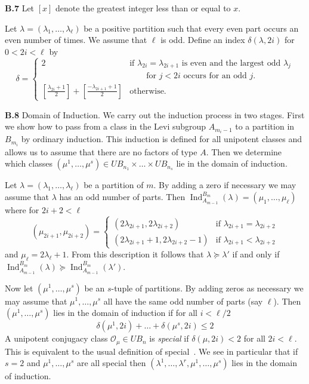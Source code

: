 \documentclass{amsart}
\newcommand\Am		{A_{m-1}}
\newcommand\Ind	{\operatorname{Ind}}
\newcommand\lam	{\lambda}
\newcommand\lams	{(\lam_1,\dots,\lam_\ell)}
\newcommand\lamsmus{(\lam^1,\dots,\lam^r,\mu^1,\dots,\mu^s)}
\newcommand\mus	{(\mu_1,\dots,\mu_\ell)}
\newcommand\cO		{{\mathcal O}}
\begin{document}
\noindent
{\bf B.7} \qquad Let $[x]$ denote the greatest integer less than or equal to
$x$.

Let $\lam = \lams$ be a positive partition such that every even part occurs
an even number of times.  We assume that $\ell$ is odd.  Define an index
$\delta(\lam,2i)$ for $0 < 2i < \ell$ by
	$$
\delta = \begin{cases} 2 &\text{if $\lam_{2i} = \lam_{2i+1}$ 
is even and the largest odd $\lam_j$} \\
&\qquad \text{for $j<2i$ occurs for an odd $j$.} \\
\left[ \textstyle{\frac{\lam_{2i} + 1}{2}} \right] + 
\left[ \textstyle{\frac{-\lam_{2i+1} + 1}{2}} \right] &\text{otherwise.}
\end{cases}
	$$

\noindent
{\bf B.8} \qquad Domain of Induction.  We carry out the induction process in
two stages.  First we show how to pass from a class in the Levi subgroup
$A_{m_i-1}$ to a partition in $B_{m_i}$ by ordinary induction.  This induction
is defined for all unipotent classes and allows us to assume that there are
no factors of type $A$.  Then we determine which classes
$(\mu^1 ,\dots, \mu^s) \in UB_{n_1} \times\dots\times UB_{n_s}$ lie in the
domain of induction.

Let $\lam = \lams$ be a partition of $m$.  By adding a zero if necessary we
may assume that $\lam$ has an odd number of parts.  Then
$\Ind_{{\Am}}^{B_m} (\lam) = \mus$ where for $2i + 2 < \ell$
	$$
(\mu_{2i+1},\mu_{2i+2}) = \begin{cases} 
(2\lam_{2i+1}, 2\lam_{2i+2}) &\text{if $\lam_{2i+1} = \lam_{2i+2}$} \\
(2\lam_{2i+1} + 1, 2\lam_{2i+2} - 1) &\text{if $\lam_{2i+1} < \lam_{2i+2}$}
\end{cases}
	$$
and $\mu_\ell = 2\lam_\ell + 1$.  From this description it follows that
$\lam \succeq \lam'$ if and only if 
$\Ind_{{\Am}}^{B_m} (\lam) \succeq \Ind_{{\Am}}^{B_m} (\lam')$.

Now let $(\mu^1 ,\dots, \mu^s)$ be an $s$-tuple of partitions.  By adding
zeros as necessary we may assume that $\mu^1 ,\dots, \mu^s$ all have the
same odd number of parts (say $\ell$).  Then $(\mu^1 ,\dots, \mu^s)$ lies in 
the domain of induction if for all $i < \ell/2$
	\begin{equation}\tag{*}
	\delta(\mu^1,2i) +\dots+ \delta(\mu^s,2i) \le 2
\end{equation}
A unipotent conjugacy class $\cO_\mu \in UB_n$ is {\it special\/} if
$\delta(\mu,2i) < 2$ for all $2i < \ell$.  This is equivalent to the usual
definition of special~\cite{C}. We see in particular that if
$s=2$ and $\mu^1,\dots,\mu^s$ are all special then $\lamsmus$ lies in the
domain of induction.  
\end{document}
